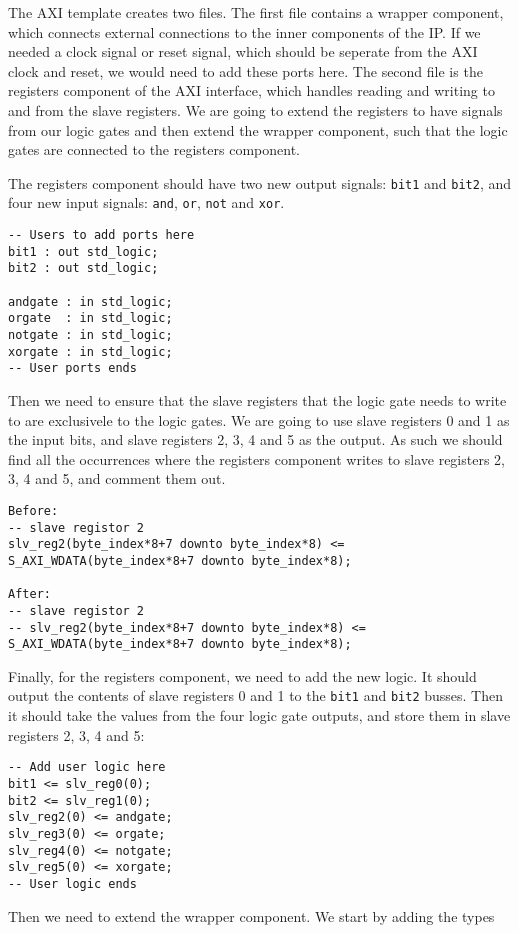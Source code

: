 The AXI template creates two files. The first file contains a wrapper component, which
connects external connections to the inner components of the IP. If we needed a
clock signal or reset signal, which should be seperate from the AXI clock and
reset, we would need to add these ports here. The second file is the registers component
of the AXI interface, which handles reading and writing to and from the slave registers.
We are going to extend the registers to have signals
from our logic gates and then extend the wrapper component, such that the logic gates
are connected to the registers component.

The registers component should have two new output signals: \texttt{bit1} and
\texttt{bit2}, and four new input signals: \texttt{and}, \texttt{or},
\texttt{not} and \texttt{xor}.
\begin{lstlisting}
-- Users to add ports here
bit1 : out std_logic;
bit2 : out std_logic;

andgate : in std_logic;
orgate  : in std_logic;
notgate : in std_logic;
xorgate : in std_logic;
-- User ports ends
\end{lstlisting}
Then we need to ensure that the slave registers that the logic gate needs to write to
are exclusivele to the logic gates. We are going to use slave registers 0 and 1 as the
input bits, and slave registers 2, 3, 4 and 5 as the output. As such we should find
all the occurrences where the registers component writes to slave registers 2, 3, 4 and 5,
and comment them out.
\begin{lstlisting}
Before:
-- slave registor 2
slv_reg2(byte_index*8+7 downto byte_index*8) <= S_AXI_WDATA(byte_index*8+7 downto byte_index*8);

After:
-- slave registor 2
-- slv_reg2(byte_index*8+7 downto byte_index*8) <= S_AXI_WDATA(byte_index*8+7 downto byte_index*8);
\end{lstlisting}
Finally, for the registers component, we need to add the new logic. It should
output the contents of slave registers 0 and 1 to the \texttt{bit1} and
\texttt{bit2} busses. Then it should take the values from the four logic gate
outputs, and store them in slave registers 2, 3, 4 and 5:
\begin{lstlisting}
-- Add user logic here
bit1 <= slv_reg0(0);
bit2 <= slv_reg1(0);
slv_reg2(0) <= andgate;
slv_reg3(0) <= orgate;
slv_reg4(0) <= notgate;
slv_reg5(0) <= xorgate;
-- User logic ends
\end{lstlisting}
Then we need to extend the wrapper component. We start by adding the types
